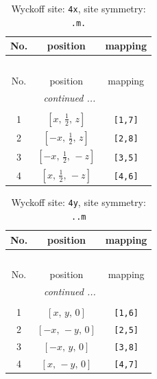 \documentclass[fleqn,8pt]{jsarticle}
\begin{document}
\renewcommand{\arraystretch}{1.2}
\begin{longtable}{ccc}
\caption{Wyckoff site: {\tt 4x}, site symmetry: {\tt .m.}}
 \\
 \hline \hline
No. & position & mapping \\ \hline \endfirsthead

\multicolumn{2}{l}{\tablename\ \thetable{}} \\
 \hline \hline
No. & position & mapping \\ \hline \endhead

 \hline \hline
\multicolumn{2}{r}{\footnotesize\it continued ...} \\ \endfoot

 \hline \hline
\multicolumn{2}{r}{} \\ \endlastfoot

1 & $\left[ x,\, \frac{1}{2},\, z \right]$ & {\tt [1,7]} \\ \hline
2 & $\left[ - x,\, \frac{1}{2},\, z \right]$ & {\tt [2,8]} \\ \hline
3 & $\left[ - x,\, \frac{1}{2},\, - z \right]$ & {\tt [3,5]} \\ \hline
4 & $\left[ x,\, \frac{1}{2},\, - z \right]$ & {\tt [4,6]} \\
\end{longtable}
\renewcommand{\arraystretch}{1.2}
\begin{longtable}{ccc}
\caption{Wyckoff site: {\tt 4y}, site symmetry: {\tt ..m}}
 \\
 \hline \hline
No. & position & mapping \\ \hline \endfirsthead

\multicolumn{2}{l}{\tablename\ \thetable{}} \\
 \hline \hline
No. & position & mapping \\ \hline \endhead

 \hline \hline
\multicolumn{2}{r}{\footnotesize\it continued ...} \\ \endfoot

 \hline \hline
\multicolumn{2}{r}{} \\ \endlastfoot

1 & $\left[ x,\, y,\, 0 \right]$ & {\tt [1,6]} \\ \hline
2 & $\left[ - x,\, - y,\, 0 \right]$ & {\tt [2,5]} \\ \hline
3 & $\left[ - x,\, y,\, 0 \right]$ & {\tt [3,8]} \\ \hline
4 & $\left[ x,\, - y,\, 0 \right]$ & {\tt [4,7]} \\
\end{longtable}
\end{document}
